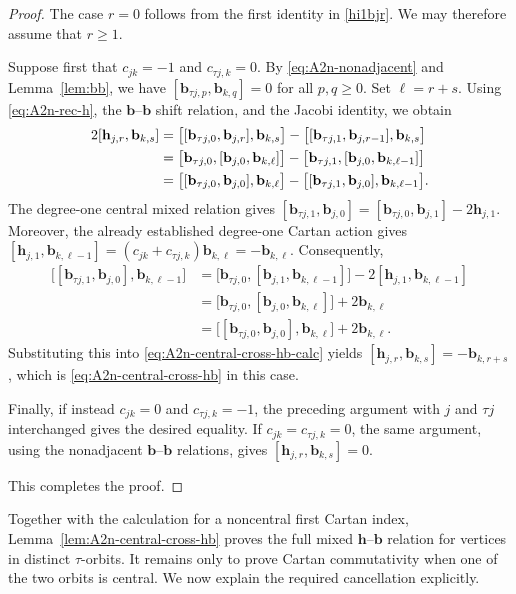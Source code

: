 \documentclass[11pt,reqno]{amsart}
\numberwithin{equation}{section}
\theoremstyle{definition}
\theoremstyle{remark}
\newcommand{\bb}{\mathbf{b}}
\newcommand{\bh}{\mathbf{h}}
\newcommand{\gge}{\geqslant}
\begin{document}
\begin{proof}
The case $r=0$ follows from the first identity in
\eqref{hi1bjr}.  We may therefore assume that $r\gge 1$.

Suppose first that $c_{jk}=-1$ and $c_{\tau j,k}=0$. By \eqref{eq:A2n-nonadjacent} and Lemma~\ref{lem:bb}, we have $[\bb_{\tau j,p},\bb_{k,q}]=0$ for all $p,q\gge 0$. Set $\ell=r+s$.  Using \eqref{eq:A2n-rec-h}, the
$\bb$--$\bb$ shift relation, and the Jacobi identity, we obtain
\begin{align}
 2[\bh_{j,r},\bb_{k,s}]
 &=
 \bigl[[\bb_{\tau j,0},\bb_{j,r}],\bb_{k,s}\bigr]
 -
 \bigl[[\bb_{\tau j,1},\bb_{j,r-1}],\bb_{k,s}\bigr]
 \notag\\
 &=
 \bigl[\bb_{\tau j,0},
       [\bb_{j,0},\bb_{k,\ell}]\bigr]
 -
 \bigl[\bb_{\tau j,1},
       [\bb_{j,0},\bb_{k,\ell-1}]\bigr]
 \notag\\
 &=
 \bigl[[\bb_{\tau j,0},\bb_{j,0}],\bb_{k,\ell}\bigr]
 -
 \bigl[[\bb_{\tau j,1},\bb_{j,0}],
       \bb_{k,\ell-1}\bigr].
 \label{eq:A2n-central-cross-hb-calc}
\end{align}
The degree-one central mixed relation gives
$[\bb_{\tau j,1},\bb_{j,0}]
 =
 [\bb_{\tau j,0},\bb_{j,1}]
 -2\bh_{j,1}$.
Moreover, the already established degree-one Cartan action gives $ [\bh_{j,1},\bb_{k,\ell-1}]
 =
 (c_{jk}+c_{\tau j,k})\bb_{k,\ell}
 =
 -\bb_{k,\ell}$.
Consequently,
\begin{align*}
 \bigl[[\bb_{\tau j,1},\bb_{j,0}],
       \bb_{k,\ell-1}\bigr]
 &=
 \bigl[\bb_{\tau j,0},
       [\bb_{j,1},\bb_{k,\ell-1}]\bigr]
 -2[\bh_{j,1},\bb_{k,\ell-1}]
 \\
 &=
 \bigl[\bb_{\tau j,0},
       [\bb_{j,0},\bb_{k,\ell}]\bigr]
 +2\bb_{k,\ell}
 \\
 &=
 \bigl[[\bb_{\tau j,0},\bb_{j,0}],
       \bb_{k,\ell}\bigr]
 +2\bb_{k,\ell}.
\end{align*}
Substituting this into
\eqref{eq:A2n-central-cross-hb-calc} yields $[\bh_{j,r},\bb_{k,s}]
 =
 -\bb_{k,r+s}$,
which is \eqref{eq:A2n-central-cross-hb} in this case.

Finally, if instead $c_{jk}=0$ and $c_{\tau j,k}=-1$,
the preceding argument with $j$ and $\tau j$ interchanged gives the desired equality. If $c_{jk}=c_{\tau j,k}=0$, the same argument, using
the nonadjacent $\bb$--$\bb$ relations, gives
$[\bh_{j,r},\bb_{k,s}]=0$.

This completes the proof.
\end{proof}

Together with the calculation for a noncentral first Cartan
index, Lemma~\ref{lem:A2n-central-cross-hb} proves the full
mixed $\bh$--$\bb$ relation for vertices in distinct
$\tau$-orbits.  It remains only to prove Cartan commutativity
when one of the two orbits is central.  We now explain the
required cancellation explicitly.
\end{document}
